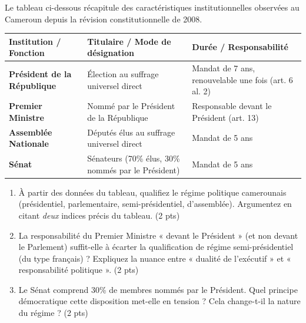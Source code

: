 \documentclass[11pt]{article}
\begin{document}
\begin{exercice}
Le tableau ci-dessous récapitule des caractéristiques institutionnelles observées au Cameroun depuis la révision constitutionnelle de 2008.

\begin{tabularx}{\linewidth}{>{\bfseries}X>{\raggedright\arraybackslash}X>{\raggedright\arraybackslash}X}
\toprule
\textbf{Institution / Fonction} & \textbf{Titulaire / Mode de désignation} & \textbf{Durée / Responsabilité} \\
\midrule
Président de la République & Élection au suffrage universel direct & Mandat de 7 ans, renouvelable une fois (art. 6 al. 2) \\
Premier Ministre & Nommé par le Président de la République & Responsable devant le Président (art. 13) \\
Assemblée Nationale & Députés élus au suffrage universel direct & Mandat de 5 ans \\
Sénat & Sénateurs (70\% élus, 30\% nommés par le Président) & Mandat de 5 ans \\
\bottomrule
\end{tabularx}

\begin{enumerate}
    \item À partir des données du tableau, qualifiez le régime politique camerounais (présidentiel, parlementaire, semi-présidentiel, d'assemblée). Argumentez en citant \textit{deux} indices précis du tableau. \hfill (2 pts)
    \item La responsabilité du Premier Ministre « devant le Président » (et non devant le Parlement) suffit-elle à écarter la qualification de régime semi-présidentiel (du type français) ? Expliquez la nuance entre « dualité de l'exécutif » et « responsabilité politique ». \hfill (2 pts)
    \item Le Sénat comprend 30\% de membres nommés par le Président. Quel principe démocratique cette disposition met-elle en tension ? Cela change-t-il la nature du régime ? \hfill (2 pts)
\end{enumerate}
\end{exercice}
\end{document}
